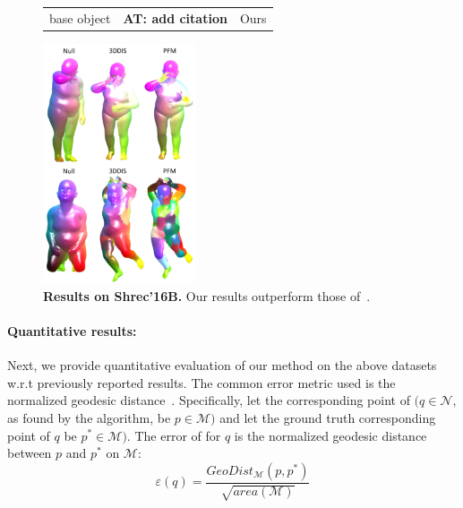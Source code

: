 \documentclass[10pt,twocolumn,letterpaper]{article}
\newcommand{\colornote}[3]{{\color{#1}\bf{#2: #3}\normalfont}}
\newcommand{\colornote}[3]{}
\newcommand {\ayellet}[1]{\colornote{blue}{AT}{#1}}
\begin{document}
\begin{figure}[htb]
	\label{fig:Shrec16TopImage}
	\centering
	\begin{tabular}{ccc}
	    base object & 
	    \ayellet{add citation} & 
	    Ours\\
	\end{tabular}
	\includegraphics[width=0.4\textwidth]{figures/SHRECTopology.png}
	\caption{{\bf Results on Shrec'16B.} 
	Our results outperform those of~\cite{rodola2017partial}.}
\end{figure}



\paragraph{Quantitative results:}
Next, we provide quantitative evaluation of our method on the above datasets w.r.t previously reported results.
The common error metric used is the normalized geodesic distance~\cite{kim2011blended}.
Specifically, let the corresponding point of $(q \in \mathcal{N}$, as found by the algorithm, be $ p \in \mathcal{M})$ and let the ground truth corresponding point of $q$ be $p^* \in \mathcal{M})$. 
The error of for $q$ is the normalized geodesic distance between  $p$ and $p^*$ on $\mathcal{M}$:
\begin{equation}
\varepsilon(q)=\frac{GeoDist_{\mathcal{M}}(p,p^*)}{\sqrt{area(\mathcal{M})}}
\end{equation}
\end{document}

